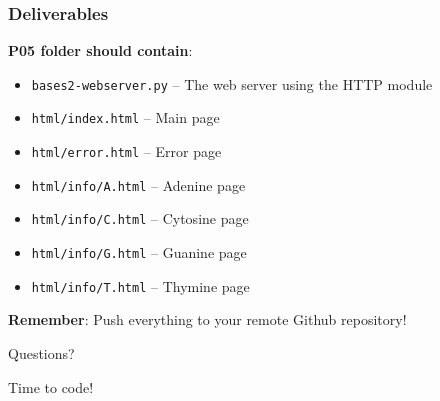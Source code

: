 \documentclass[xcolor=table]{beamer}
\begin{document}
\begin{frame}
\frametitle{Deliverables}

\textbf{P05 folder should contain}:

\vspace{0.2cm}

\begingroup\small
\begin{itemize}
\item \texttt{bases2-webserver.py} -- The web server using the HTTP module
\item \texttt{html/index.html} -- Main page
\item \texttt{html/error.html} -- Error page
\item \texttt{html/info/A.html} -- Adenine page
\item \texttt{html/info/C.html} -- Cytosine page
\item \texttt{html/info/G.html} -- Guanine page
\item \texttt{html/info/T.html} -- Thymine page
\end{itemize}
\endgroup

\vspace{0.3cm}

\textbf{Remember}: Push everything to your remote Github repository!

\end{frame}


\begin{frame}
\begin{center}
\Huge{Questions?}

\vspace{1cm}

\Large{Time to code!}
\end{center}
\end{frame}
\end{document}
